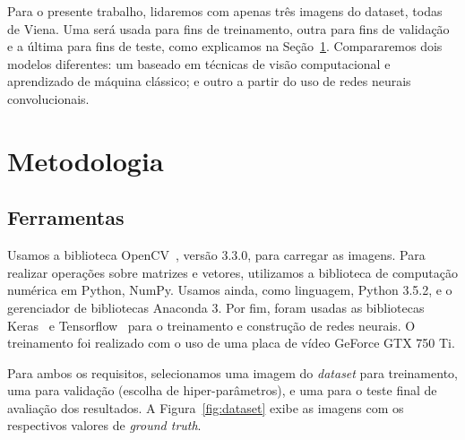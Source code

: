 \documentclass{bmvc2k}
\begin{document}
Para o presente trabalho, lidaremos com apenas três imagens do dataset, todas de Viena. Uma será usada para fins de treinamento, outra para fins de validação e a última para fins de teste, como explicamos na Seção~\ref{sec:met}. Compararemos dois modelos diferentes: um baseado em técnicas de visão computacional e aprendizado de máquina clássico; e outro a partir do uso de redes neurais convolucionais. 


\section{Metodologia}
\label{sec:met}

\subsection{Ferramentas}
Usamos a biblioteca OpenCV~\cite{opencv_library}, versão 3.3.0, para carregar as imagens. Para realizar operações sobre matrizes e vetores, utilizamos a biblioteca de computação numérica em Python, NumPy. Usamos ainda, como linguagem, Python 3.5.2, e o gerenciador de bibliotecas Anaconda 3. Por fim, foram usadas as bibliotecas Keras~\cite{chollet2015keras} e Tensorflow~\cite{tensorflow2015-whitepaper} para o treinamento e construção de redes neurais. O treinamento foi realizado com o uso de uma placa de vídeo GeForce GTX 750 Ti.

Para ambos os requisitos, selecionamos uma imagem do \textit{dataset} para treinamento, uma para validação (escolha de hiper-parâmetros), e uma para o teste final de avaliação dos resultados. A Figura~\ref{fig:dataset} exibe as imagens com os respectivos valores de \textit{ground truth}.
\end{document}
